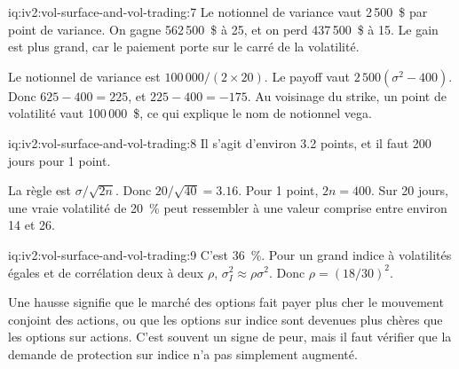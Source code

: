 \begin{solution}{iq:iv2:vol-surface-and-vol-trading:7}
Le notionnel de variance vaut 2\,500~\$ par point de variance. On gagne 562\,500~\$ à 25, et on perd 437\,500~\$ à 15. Le gain est plus grand, car le paiement porte sur le carré de la volatilité.

Le notionnel de variance est $100\,000/(2 \times 20)$. Le payoff vaut $2\,500(\sigma^2 - 400)$. Donc $625 - 400 = 225$, et $225 - 400 = -175$. Au voisinage du strike, un point de volatilité vaut 100\,000~\$, ce qui explique le nom de notionnel vega.

\end{solution}

\begin{solution}{iq:iv2:vol-surface-and-vol-trading:8}
Il s'agit d'environ 3.2 points, et il faut 200 jours pour 1 point.

La règle est $\sigma/\sqrt{2n}$. Donc $20/\sqrt{40} = 3.16$. Pour 1 point, $2n = 400$. Sur 20 jours, une vraie volatilité de 20~\% peut ressembler à une valeur comprise entre environ 14 et 26.

\end{solution}

\begin{solution}{iq:iv2:vol-surface-and-vol-trading:9}
C'est 36~\%. Pour un grand indice à volatilités égales et de corrélation deux à deux $\rho$, $\sigma_I^2 \approx \rho\sigma^2$. Donc $\rho = (18/30)^2$.

Une hausse signifie que le marché des options fait payer plus cher le mouvement conjoint des actions, ou que les options sur indice sont devenues plus chères que les options sur actions. C'est souvent un signe de peur, mais il faut vérifier que la demande de protection sur indice n'a pas simplement augmenté.

\end{solution}

